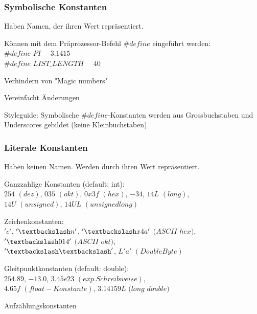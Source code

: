 	 		\begin{minipage}[t]{8 cm}
		 		\subsubsection{Symbolische Konstanten }
		 			Haben Namen, der ihren Wert repräsentiert.
		 			\begin{compactitem}
		 				\item Können mit dem Präprozessor-Befehl $\#define$ eingeführt werden:\\
		 				$\#define$ $PI$ \ \ $3.1415$\\
		 				$\#define$ $LIST\_LENGTH$ \ \ $40$
		 				\item Verhindern von "Magic numbers"
		 				\item Vereinfacht Änderungen
		 				\item Styleguide: Symbolische $\#define$-Konstanten werden aus Grossbuchstaben und Underscores gebildet (keine Kleinbuchstaben) 			 	
		 			\end{compactitem}
		 	\end{minipage}
		 	\hspace*{1.0 cm}
		 	\begin{minipage}[t]{9 cm}
 				\subsubsection{Literale Konstanten }
 					Haben keinen Namen. Werden durch ihren Wert repräsentiert.
 					\begin{compactitem}
	 					\item Ganzzahlige Konstanten (default: int):\\
	 					$254$ $(dez)$, $035$ $(okt)$, $0x3f$ $(hex)$, $-34$, $14L$ $(long)$,\\ $14U$ $(unsigned)$, $14UL$ $(unsigned long)$
	 					\item Zeichenkonstanten:\\
	 					$'c'$, $'\textbackslash n'$, $'\textbackslash x4a'$ $(ASCII$ $hex)$, $'\textbackslash014'$ $(ASCII$ $okt)$, \\$'\textbackslash \textbackslash'$, $L'a'$ $(Double Byte)$
	 					\item Gleitpunktkonstanten (default: double):\\
	 					$254.89$, $-13.0$, $3.45e23$ $(exp. Schreibweise)$, \\ $4.65f$ $(float-Konstante)$,  $3.14159L$ $(long$ $double)$
	 					\item Aufzählungskonstanten		 				 			 	
 					\end{compactitem}
 			\end{minipage}
